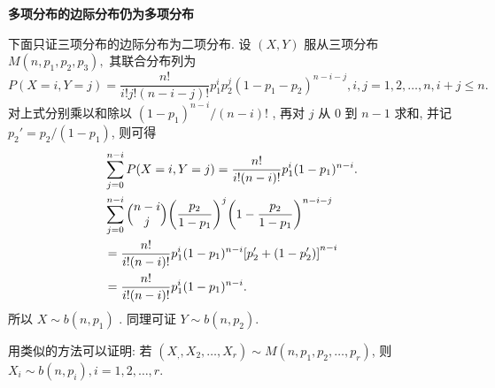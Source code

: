   \begin{example}\label{exam:3.2.4}
  	\textbf{多项分布的边际分布仍为多项分布}
  \end{example}
  \begin{solution}
  	下面只证三项分布的边际分布为二项分布. 设 $(X,Y)$ 服从三项分布 $M(n,p_1,p_2,p_3),$  其联合分布列为
  	\begin{equation*}
  	P(X=i,Y=j)=\frac{n!}{i!j!(n-i-j)!}p_1^ip_2^j(1-p_1-p_2)^{n-i-j}, i,j=1,2,\ldots,n,i+j\leqslant n.
  	\end{equation*}
  	对上式分别乘以和除以 $(1-p_1)^{n-i}/(n-i)!$ , 再对 $j$ 从 $0$ 到 $n-1$ 求和, 并记 $p_2'=p_2/(1-p_1)$, 则可得
  	\begin{align*}
  	&\sum_{j=0}^{n-i}P(X=i,Y=j) = \frac{n!}{i!(n-i)!}p_1^i(1-p_1)^{n-i}.\\
  	&\sum_{j=0}^{n-i} \Binom{n-i}{j} \left(\frac{p_2}{1-p_1}\right)^{j}\left(1-\frac{p_2}{1-p_1}\right)^{n-i-j} \\
  	&= \frac{n!}{i!(n-i)!}p_1^i(1-p_1)^{n-i}\left[p_2'+(1-p_2')\right]^{n-i}\\
  	&= \frac{n!}{i!(n-i)!}p_1^i(1-p_1)^{n-i}.
  	\end{align*}
  	所以 $X\sim b(n,p_1)$ . 同理可证 $Y\sim b(n,p_2)$.
  	
  	用类似的方法可以证明: 若 $(X_,,X_2,\ldots,X_r)\sim M(n,p_1,p_2,\ldots,p_r)$, 则 $X_i\sim b(n,p_i), i=1,2,\ldots,r$.
  \end{solution}

